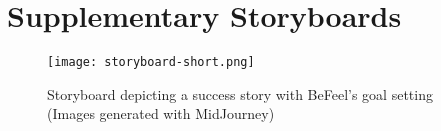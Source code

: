 \documentclass[acmsmall, screen, nonacm, 9pt, a4paper,top=2cm,bottom=2cm,left=1cm,right=1cm, marginparwidth=1cm]{acmart}
\begin{document}



\appendix
\section{Supplementary Storyboards}
\begin{figure}[H]
    \centering
    \texttt{[image: storyboard-short.png]}
    \caption{Storyboard depicting a success story with BeFeel's goal setting (Images generated with MidJourney)}
    \label{fig:storyboard-short}
\end{figure}
\end{document}

